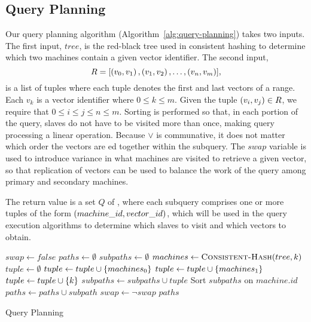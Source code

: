 \subsection{Query Planning}
Our query planning algorithm (Algorithm~\ref{alg:query-planning}) takes two
inputs. The first input, \(tree\), is the red-black tree used in consistent
hashing to determine which two machines contain a given vector identifier.
The second input,
\[R = [\left(v_0, v_1\right), \left(v_1, v_2\right), \ldots, \left(v_n, v_m\right)],\]
is a list of tuples where each tuple denotes the first and last vectors of a
range. Each \(v_k\) is a vector identifier where \(0 \leq k \leq m\). Given the
tuple \(\left(v_i, v_j\right) \in R\), we require that
\(0 \leq i \leq j \leq n \leq m\). Sorting is performed so that, in each
portion of the query, slaves do not have to be visited more than once, making
query processing a linear operation. Because \(\lor\) is communative, it does
not matter which order the vectors are ed together within the
subquery. The \(swap\) variable is used to introduce variance in what machines
are visited to retrieve a given vector, so that replication of vectors can be
used to balance the work of the query among primary and secondary machines.
\par
The return value is a set $Q$ of , where each subquery
comprises one or more tuples of the form \(\left(machine\_id,vector\_id\right)\),
which will be used in the query execution algorithms to determine which slaves
to visit and which vectors to obtain.
%
\begin{algorithm}
    \begin{algorithmic}
            \State $swap \gets false$
            \State $paths \gets \emptyset$
                \State $subpaths \gets \emptyset$
                    \State $machines \gets \Call{Consistent-Hash}{tree, k}$
                    \State $tuple \gets \emptyset$
                        \State $tuple \gets tuple \cup \left\{machines_0\right\}$
                    \Else
                        \State $tuple \gets tuple \cup \left\{machines_1\right\}$
                    \EndIf
                    \State $tuple \gets tuple \cup \left\{k\right\}$
                    \State $subpaths \gets subpaths \cup tuple$
                \EndFor
                \State Sort $subpaths$ on $machine.id$
                \State $paths \gets paths \cup subpath$
                \State $swap \gets \neg swap$
            \EndFor
            \Return $paths$
        \EndProcedure
    \end{algorithmic}
    \caption{Query Planning}
    \label{alg:query-planning}
\end{algorithm}
%
